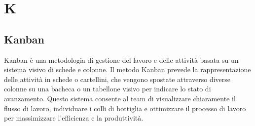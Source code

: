 \section{K}

\vspace{2em}
\subsection*{Kanban}
Kanban è una metodologia di gestione del lavoro e delle attività basata su un sistema visivo di schede e colonne. Il metodo Kanban prevede la rappresentazione delle attività in schede o cartellini, che vengono spostate attraverso diverse colonne su una bacheca o un tabellone visivo per indicare lo stato di avanzamento. Questo sistema consente al team di visualizzare chiaramente il flusso di lavoro, individuare i colli di bottiglia e ottimizzare il processo di lavoro per massimizzare l'efficienza e la produttività.



